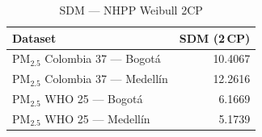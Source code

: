 \begin{table}[htbp]
\centering
\caption{SDM --- NHPP Weibull 2CP}
\label{tab:nhpp_sdm_2cp}
\begin{tabular}{lr}
\toprule
Dataset & SDM (2\,CP) \\
\midrule
PM$_{2.5}$ Colombia 37 --- Bogot\'{a} & 10.4067 \\
PM$_{2.5}$ Colombia 37 --- Medell\'{i}n & 12.2616 \\
PM$_{2.5}$ WHO 25 --- Bogot\'{a} & 6.1669 \\
PM$_{2.5}$ WHO 25 --- Medell\'{i}n & 5.1739 \\
\bottomrule
\end{tabular}
\end{table}
